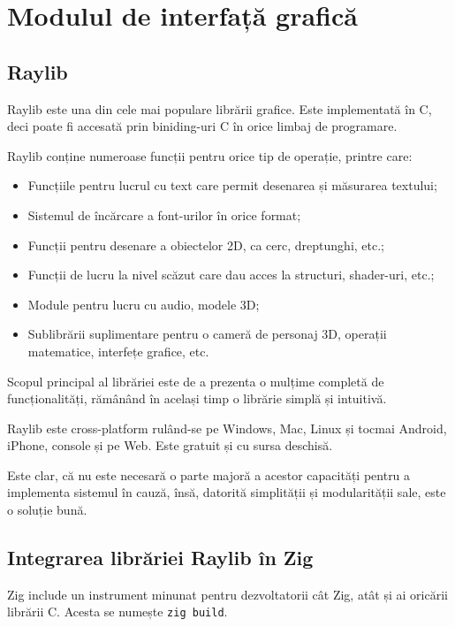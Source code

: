 \documentclass[a4paper,12pt]{report}
\begin{document}
\section{Modulul de interfață grafică}

\subsection{Raylib}

Raylib este una din cele mai populare librării grafice.
Este implementată în C, deci poate fi accesată prin biniding-uri C în orice limbaj de programare.

Raylib conține numeroase funcții pentru orice tip de operație, printre care:
\begin{itemize}
    \item Funcțiile pentru lucrul cu text care permit desenarea și măsurarea textului;
    \item Sistemul de încărcare a font-urilor în orice format;
    \item Funcții pentru desenare a obiectelor \ac{2D}, ca cerc, dreptunghi, etc.;
    \item Funcții de lucru la nivel scăzut care dau acces la structuri, shader-uri, etc.;
    \item Module pentru lucru cu audio, modele \ac{3D};
    \item Sublibrării suplimentare pentru o cameră de personaj \ac{3D}, operații matematice, interfețe grafice, etc.
\end{itemize}

Scopul principal al librăriei este de a prezenta o mulțime completă de funcționalități,
rămânând în același timp o librărie simplă și intuitivă.

Raylib este cross-platform rulând-se pe Windows, Mac, Linux și tocmai Android, iPhone, console și pe Web.
Este gratuit și cu sursa deschisă.

Este clar, că nu este necesară o parte majoră a acestor capacități pentru a implementa sistemul în cauză,
însă, datorită simplității și modularității sale, este o soluție bună.


\subsection{Integrarea librăriei Raylib în Zig}

Zig include un instrument minunat pentru dezvoltatorii cât Zig,
atât și ai oricării librării C. Acesta se numește \texttt{zig build}.
\end{document}
